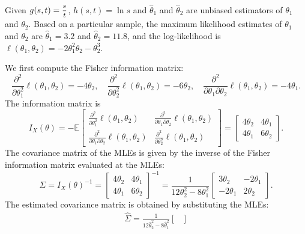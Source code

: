 \begin{example}
    Given $g(s,t) = \mfrac{s}{t}$, $h(s,t) = \ln s$ and 
    $\widehat{\theta}_1$ and $\widehat{\theta}_2$ are unbiased estimators of $\theta_1$ and $\theta_2$. Based 
    on a particular sample, the maximum likelihood estimates of $\theta_1$ and $\theta_2$ are $\widehat{\theta}_1 = 3.2$ and $\widehat{\theta}_2 = 11.8$, 
    and the log-likelihood is $\ell(\theta_1, \theta_2) = -2\theta_1^2 \theta_2 - \theta_2^3$.
\end{example}
\begin{solution}
    We first compute the Fisher information matrix:
    \[
        \frac{\partial^2}{\partial \theta_1^2} \ell(\theta_1, \theta_2) = -4\theta_2, \quad
        \frac{\partial^2}{\partial \theta_2^2} \ell(\theta_1, \theta_2) = -6\theta_2, \quad
        \frac{\partial^2}{\partial \theta_1 \partial \theta_2} \ell(\theta_1, \theta_2) = -4\theta_1.
    \]
    The information matrix is 
    \[
        I_X(\theta) = -\mathbb{E} \begin{bmatrix}
            \frac{\partial^2}{\partial \theta_1^2} \ell(\theta_1, \theta_2) & \frac{\partial^2}{\partial \theta_1 \partial \theta_2} \ell(\theta_1, \theta_2) \\
            \frac{\partial^2}{\partial \theta_1 \partial \theta_2} \ell(\theta_1, \theta_2) & \frac{\partial^2}{\partial \theta_2^2} \ell(\theta_1, \theta_2)
        \end{bmatrix} = \begin{bmatrix}
            4\theta_2 & 4\theta_1 \\
            4\theta_1 & 6\theta_2
        \end{bmatrix}.
    \]
    The covariance matrix of the MLEs is given by the inverse of the Fisher information matrix evaluated at the MLEs:
    \[
        \Sigma = I_X(\theta)^{-1} = \begin{bmatrix}
            4\theta_2 & 4 \theta_1 \\
            4\theta_1 & 6 \theta_2
        \end{bmatrix}^{-1} = \frac{1}{12 \theta_2^2 - 8\theta^2_1} \begin{bmatrix}
            3\theta_2 & -2\theta_1 \\
            -2\theta_1 & 2\theta_2
        \end{bmatrix}.
    \]
    The estimated covariance matrix is obtained by substituting the MLEs:
    \begin{align*}
        \widehat{\Sigma} 
        = \frac{1}{12 \widehat{\theta}_2^2 - 8\widehat{\theta}^2_1} \begin{bmatrix}

\end{bmatrix}
\end{align*}
\end{solution}
